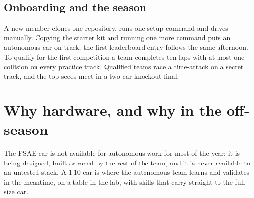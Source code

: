 \documentclass[11pt,a4paper]{article}
\begin{document}
\subsection{Onboarding and the season}

A new member clones one repository, runs one setup command and drives manually. Copying the
starter kit and running one more command puts an autonomous car on track; the first
leaderboard entry follows the same afternoon. To qualify for the first competition a team
completes ten laps with at most one collision on every practice track. Qualified teams race a
time-attack on a secret track, and the top seeds meet in a two-car knockout final.

\section{Why hardware, and why in the off-season}
\label{sec:why}

The FSAE car is not available for autonomous work for most of the year: it is being designed,
built or raced by the rest of the team, and it is never available to an untested stack. A
1:10 car is where the autonomous team learns and validates in the meantime, on a table in the
lab, with skills that carry straight to the full-size car.
\end{document}
